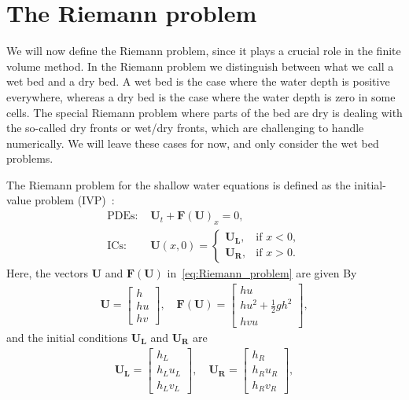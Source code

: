 \section{The Riemann problem}
We will now define the Riemann problem, since it plays a crucial role in the finite volume method.
In the Riemann problem we distinguish between what we call a wet bed and a dry bed. 
A wet bed is the case where the water depth is positive everywhere, whereas a dry bed is the case where the water depth is zero in some cells.
The special Riemann problem where parts of the bed are dry is dealing with the so-called dry fronts or wet/dry fronts, which are challenging to handle numerically.
We will leave these cases for now, and only consider the wet bed problems.

The Riemann problem for the shallow water equations is defined as the initial-value problem (IVP)~\cite{Toro2024}:
\begin{equation}\label{eq:Riemann_problem}
    \begin{aligned}
        \text{PDEs: } &\mathbf{U}_t + {\mathbf{F(U)}}_x = 0, \\
        \text{ICs: } &\mathbf{U}(x, 0) = \begin{cases}
            \mathbf{U_L}, & \text{if  } x < 0, \\
            \mathbf{U_R}, & \text{if  } x > 0.
        \end{cases}
    \end{aligned}
    \end{equation}
Here, the vectors $\mathbf{U}$ and $\mathbf{F(U)}$ in~\eqref{eq:Riemann_problem} are given By
\begin{align}
    \mathbf{U} = \begin{bmatrix}
        h \\ hu \\ hv
    \end{bmatrix}, \quad
    \mathbf{F(U)} = \begin{bmatrix}
        hu \\ hu^2 + \frac{1}{2}gh^2 \\ hvu
    \end{bmatrix},
\end{align}
and the initial conditions $\mathbf{U_L}$ and $\mathbf{U_R}$ are
\begin{align*}
    \mathbf{U_L} = \begin{bmatrix}
        h_L \\ h_L u_L \\ h_L v_L
    \end{bmatrix}, \quad 
    \mathbf{U_R} = \begin{bmatrix}
        h_R \\ h_R u_R \\ h_R v_R
    \end{bmatrix},
\end{align*}

